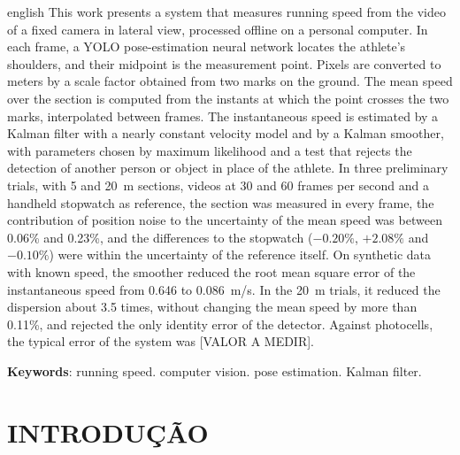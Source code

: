 \documentclass[
    12pt,               %
    openright,          %
    twoside,            %
    a4paper,            %
    chapter=TITLE,      %
    english,            %
    brazil              %
    ]{abntex2}
\begin{document}
\begin{resumo}[Abstract]
\begin{otherlanguage*}{english}
This work presents a system that measures running speed from the video of a fixed camera in lateral view, processed offline on a personal computer. In each frame, a YOLO pose-estimation neural network locates the athlete's shoulders, and their midpoint is the measurement point. Pixels are converted to meters by a scale factor obtained from two marks on the ground. The mean speed over the section is computed from the instants at which the point crosses the two marks, interpolated between frames. The instantaneous speed is estimated by a Kalman filter with a nearly constant velocity model and by a Kalman smoother, with parameters chosen by maximum likelihood and a test that rejects the detection of another person or object in place of the athlete. In three preliminary trials, with 5 and 20~m sections, videos at 30 and 60 frames per second and a handheld stopwatch as reference, the section was measured in every frame, the contribution of position noise to the uncertainty of the mean speed was between 0.06\% and 0.23\%, and the differences to the stopwatch ($-0.20\%$, $+2.08\%$ and $-0.10\%$) were within the uncertainty of the reference itself. On synthetic data with known speed, the smoother reduced the root mean square error of the instantaneous speed from 0.646 to 0.086~m/s. In the 20~m trials, it reduced the dispersion about 3.5 times, without changing the mean speed by more than 0.11\%, and rejected the only identity error of the detector. Against photocells, the typical error of the system was [VALOR A MEDIR].

\vspace{\onelineskip}
\noindent
\textbf{Keywords}: running speed. computer vision. pose estimation. Kalman filter.
\end{otherlanguage*}
\end{resumo}

\tableofcontents*
\cleardoublepage

\textual

\chapter{INTRODUÇÃO}
\end{document}
